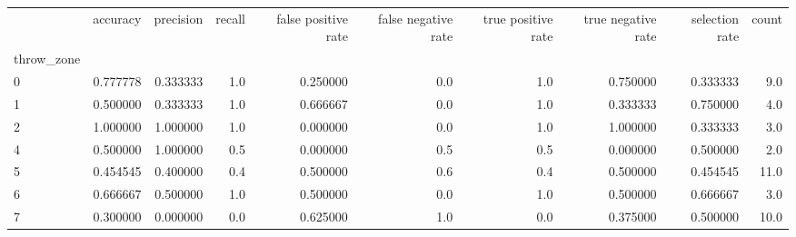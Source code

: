 \begin{tabular}{lrrrrrrrrr}
\toprule
{} &  accuracy &  precision &  recall &  false positive rate &  false negative rate &  true positive rate &  true negative rate &  selection rate &  count \\
throw\_zone &           &            &         &                      &                      &                     &                     &                 &        \\
\midrule
0          &  0.777778 &   0.333333 &     1.0 &             0.250000 &                  0.0 &                 1.0 &            0.750000 &        0.333333 &    9.0 \\
1          &  0.500000 &   0.333333 &     1.0 &             0.666667 &                  0.0 &                 1.0 &            0.333333 &        0.750000 &    4.0 \\
2          &  1.000000 &   1.000000 &     1.0 &             0.000000 &                  0.0 &                 1.0 &            1.000000 &        0.333333 &    3.0 \\
4          &  0.500000 &   1.000000 &     0.5 &             0.000000 &                  0.5 &                 0.5 &            0.000000 &        0.500000 &    2.0 \\
5          &  0.454545 &   0.400000 &     0.4 &             0.500000 &                  0.6 &                 0.4 &            0.500000 &        0.454545 &   11.0 \\
6          &  0.666667 &   0.500000 &     1.0 &             0.500000 &                  0.0 &                 1.0 &            0.500000 &        0.666667 &    3.0 \\
7          &  0.300000 &   0.000000 &     0.0 &             0.625000 &                  1.0 &                 0.0 &            0.375000 &        0.500000 &   10.0 \\
\bottomrule
\end{tabular}
